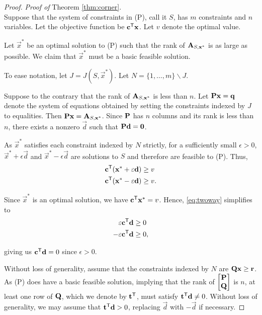 \begin{proof}

\emph{Proof of} Theorem \ref{thm:corner}.\\
Suppose that the system of constraints in (P), call it \(S\), has \(m\)
constraints and \(n\) variables. Let the objective function be
\(\mathbf{c}^{\mathsf{T}} \mathbf{x}\). Let \(v\) denote the optimal value.

Let \(\vec{x}^*\) be an optimal solution to (P) such that the rank of
\(\mathbf{A}_{S,\mathbf{x}^*}\) is as large as possible. We claim that
\(\vec{x}^*\) must be a basic feasible solution.

To ease notation, let \(J = J(S,\vec{x}^*)\). Let
\(N = \{1,\ldots,m\} \backslash J\).

Suppose to the contrary that the rank of \(\mathbf{A}_{S,\mathbf{x}^*}\) is
less than \(n\). Let \(\mathbf{P}\mathbf{x} = \mathbf{q}\) denote the system of
equations obtained by setting the constraints indexed by \(J\) to
equalities. Then \(\mathbf{P}\mathbf{x} = \mathbf{A}_{S,\mathbf{x}^*}\). Since
\(\mathbf{P}\) has \(n\) columns and its rank is less than \(n\), there
exists a nonzero \(\vec{d}\) such that \(\mathbf{P} \mathbf{d} = \mathbf{0}\).

As \(\vec{x}^*\) satisfies each constraint indexed by \(N\) strictly,
for a sufficiently small \(\epsilon \gt 0\),
\(\vec{x}^* + \epsilon \vec{d}\) and \(\vec{x}^* - \epsilon \vec{d}\)
are solutions to \(S\) and therefore are feasible to (P). Thus,
\begin{align}
\begin{split}
\mathbf{c}^{\mathsf{T}} (\mathbf{x}^* + \varepsilon \mathbf{d}) & \geq v \\
\mathbf{c}^{\mathsf{T}} (\mathbf{x}^* - \varepsilon \mathbf{d}) & \geq v.
\end{split}\label{eq:twoway}
\end{align}

Since \(\vec{x}^*\) is an optimal solution, we have
\(\mathbf{c}^{\mathsf{T}}\mathbf{x}^* = v\). Hence, \eqref{eq:twoway} simplifies to
\begin{align*}
\varepsilon \mathbf{c}^{\mathsf{T}} \mathbf{d} & \geq 0 \\
-\varepsilon \mathbf{c}^{\mathsf{T}} \mathbf{d} & \geq 0,
\end{align*}

giving us \(\mathbf{c}^{\mathsf{T}}\mathbf{d} = 0\) since \(\epsilon \gt 0\).

Without loss of generality, assume that the constraints indexed by \(N\)
are \(\mathbf{Q}\mathbf{x} \geq \mathbf{r}\). As (P) does have a basic feasible
solution, implying that the rank of
\(\begin{bmatrix} \mathbf{P} \\ \mathbf{Q}\end{bmatrix}\) is \(n\), at least one
row of \(\mathbf{Q}\), which we denote by \(\mathbf{t}^{\mathsf{T}}\), must satisfy
\(\mathbf{t}^{\mathsf{T}}\mathbf{d}\neq 0\). Without loss of generality, we may assume
that \(\mathbf{t}^{\mathsf{T}}\mathbf{d} > 0\), replacing \(\vec{d}\) with
\(-\vec{d}\) if necessary.


\end{proof}
